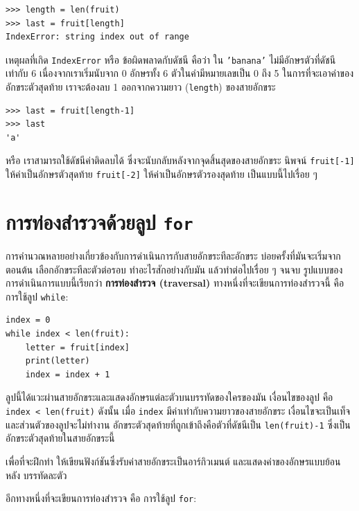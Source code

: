 \begin{verbatim}
>>> length = len(fruit)
>>> last = fruit[length]
IndexError: string index out of range
\end{verbatim}
%
เหตุผลที่เกิด {\tt IndexError} หรือ ข้อผิดพลาดกับดัชนี คือว่า ใน {\tt 'banana'} ไม่มีอักษรตัวที่ดัชนีเท่ากับ 6 
เนื่องจากเราเริ่มนับจาก 0  อักษรทั้ง 6 ตัวในคำมีหมายเลขเป็น 0 ถึง 5 ในการที่จะเอาค่าของอักขระตัวสุดท้าย เราจะต้องลบ 1 
ออกจากความยาว ({\tt length}) ของสายอักขระ
\begin{verbatim}
>>> last = fruit[length-1]
>>> last
'a'
\end{verbatim}
%
หรือ เราสามารถใช้ดัชนีค่าติดลบได้ ซึ่งจะนับกลับหลังจากจุดสิ้นสุดของสายอักขระ นิพจน์ {\tt fruit[-1]} 
ให้ค่าเป็นอักษรตัวสุดท้าย {\tt fruit[-2]} ให้ค่าเป็นอักษรตัวรองสุดท้าย เป็นแบบนี้ไปเรื่อย ๆ



\section{การท่องสำรวจด้วยลูป {\tt for}} %
\label{for}

การคำนวณหลายอย่างเกี่ยวข้องกับการดำเนินการกับสายอักขระทีละอักขระ บ่อยครั้งที่มันจะเริ่มจากตอนต้น
เลือกอักขระทีละตัวต่อรอบ ทำอะไรสักอย่างกับมัน แล้วทำต่อไปเรื่อย ๆ จนจบ 
รูปแบบของการดำเนินการแบบนี้เรียกว่า {\bf การท่องสำรวจ (traversal)} ทางหนึ่งที่จะเขียนการท่องสำรวจนี้
คือการใช้ลูป {\tt while}:

\begin{verbatim}
index = 0
while index < len(fruit):
    letter = fruit[index]
    print(letter)
    index = index + 1
\end{verbatim}
%
ลูปนี้ได้แวะผ่านสายอักขระและแสดงอักษรแต่ละตัวบนบรรทัดของใครของมัน เงื่อนไขของลูป คือ 
{\tt index < len(fruit)}  ดังนั้น เมื่อ {\tt index} มีค่าเท่ากับความยาวของสายอักขระ
เงื่อนไขจะเป็นเท็จ และส่วนตัวของลูปจะไม่ทำงาน อักขระตัวสุดท้ายที่ถูกเข้าถึงคือตัวที่ดัชนีเป็น 
{\tt len(fruit)-1} ซึ่งเป็นอักขระตัวสุดท้ายในสายอักขระนี้

เพื่อที่จะฝึกทำ ให้เขียนฟังก์ชันซึ่งรับค่าสายอักขระเป็นอาร์กิวเมนต์ และแสดงค่าของอักษรแบบย้อนหลัง 
บรรทัดละตัว

อีกทางหนึ่งที่จะเขียนการท่องสำรวจ คือ การใช้ลูป {\tt for}:


